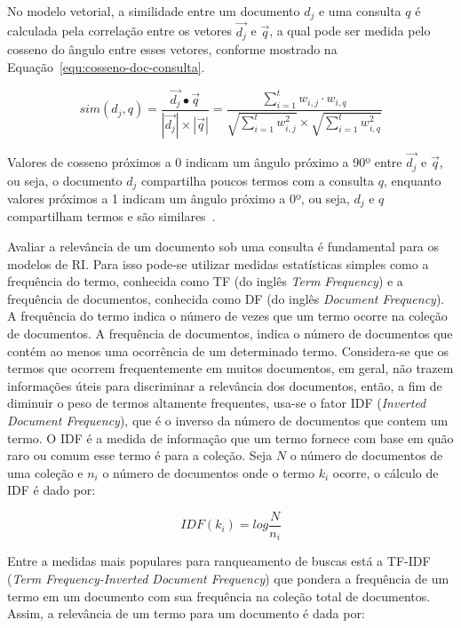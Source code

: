 No modelo vetorial, a similidade entre um documento $d_j$ e uma consulta $q$ é calculada pela correlação entre os vetores $\vec{d_j}$ e $\vec{q}$, a qual pode ser medida pelo cosseno do  ângulo entre esses vetores, conforme mostrado na Equação~\ref{equ:cosseno-doc-consulta}.



\begin{equation}
sim(d_j, q) = \frac{ \vec{d_j} \bullet \vec{q} }
                   { |\vec{d_j}| \times | \vec{q}|}
            = \frac{ \sum_{i=1}^{t} w_{i,j} \cdot w_{i,q} }
                   { \sqrt{\sum_{i=1}^{t} w_{i,j}^2} \times \sqrt{\sum_{i=1}^{t} w_{i,q}^2 } }                   \label{equ:cosseno-doc-consulta}		                   
\end{equation} 


Valores de cosseno próximos a 0 indicam um ângulo próximo a 90º entre $\vec{d_j}$ e $\vec{q}$, ou seja, o documento $d_j$ compartilha poucos termos com a consulta $q$, enquanto valores próximos a 1 indicam um ângulo próximo a 0º, ou seja, $d_j$ e $q$ compartilham termos e são similares~\cite{Tan2005,Feldman2006}.

Avaliar a relevância de um documento sob uma consulta é fundamental para os modelos de RI. Para isso pode-se utilizar medidas estatísticas simples como a frequência do termo, conhecida como TF (do inglês \textit{Term Frequency}) e a frequência de documentos, conhecida como DF (do inglês \textit{Document Frequency}). A frequência do termo indica o número de vezes que um termo ocorre na coleção de documentos. A frequência de documentos, indica o número de documentos que contém ao menos uma ocorrência de um determinado termo. Considera-se que os termos que ocorrem frequentemente em muitos documentos, em geral, não trazem informações úteis para discriminar a relevância dos documentos, então, a fim de diminuir o peso de termos altamente frequentes, usa-se o fator IDF (\textit{Inverted Document Frequency}), que é o inverso da número de documentos que contem um termo. O IDF é a medida de informação que um termo fornece com base em quão raro ou comum esse termo é para a coleção. Seja $N$ o número de documentos de uma coleção e $n_i$ o número de documentos onde o termo $k_i$ ocorre, o cálculo de IDF é dado por: 

	\begin{equation}
		IDF(k_i) = log\frac{N}{n_i}
		\label{equ:IDF}
	\end{equation}

Entre a medidas mais populares para ranqueamento de buscas está a TF-IDF (\textit{Term Frequency-Inverted Document Frequency}) que pondera a frequência de um termo em um documento com sua frequência na coleção total de documentos. Assim, a relevância de um termo para um documento é dada por:

